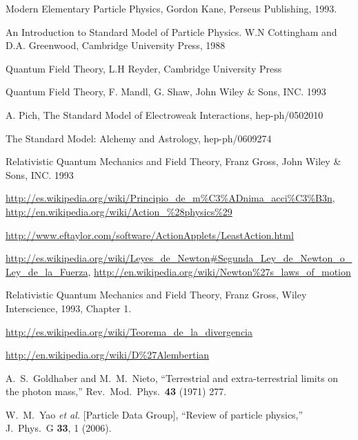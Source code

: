 
\begin{thebibliography}{999}
Modern Elementary Particle Physics, Gordon Kane, Perseus Publishing, 1993.

An Introduction to Standard Model of Particle Physics. W.N Cottingham and D.A. Greenwood, Cambridge University Press, 1988

Quantum Field Theory, L.H Reyder, Cambridge University Press

Quantum Field Theory, F. Mandl, G. Shaw, John Wiley \& Sons, INC. 1993

A. Pich, The Standard Model of Electroweak Interactions, hep-ph/0502010

The Standard Model: Alchemy and Astrology, hep-ph/0609274

Relativistic Quantum Mechanics and Field Theory, Franz Gross, John Wiley \& Sons, INC. 1993

\url{http://es.wikipedia.org/wiki/Principio_de_m\%C3\%ADnima_acci\%C3\%B3n}, 
\url{http://en.wikipedia.org/wiki/Action_\%28physics\%29}


\url{http://www.eftaylor.com/software/ActionApplets/LeastAction.html}

\url{http://es.wikipedia.org/wiki/Leyes_de_Newton#Segunda_Ley_de_Newton_o_Ley_de_la_Fuerza}, 
\href{http://en.wikipedia.org/wiki/Newton\%27s_laws_of_motion#Newton.27s_second_law:_law_of_acceleration}{http://en.wikipedia.org/wiki/Newton\%27s\_laws\_of\_motion}

Relativistic Quantum Mechanics and Field Theory, Franz Gross, Wiley Interscience, 1993, Chapter 1.

\url{http://es.wikipedia.org/wiki/Teorema_de_la_divergencia}

\url{http://en.wikipedia.org/wiki/D%27Alembertian}

  A.~S.~Goldhaber and M.~M.~Nieto,
  ``Terrestrial and extra-terrestrial limits on the photon mass,''
  Rev.\ Mod.\ Phys.\  {\bf 43} (1971) 277.

  W.~M.~Yao {\it et al.}  [Particle Data Group],
  ``Review of particle physics,''
  J.\ Phys.\ G {\bf 33}, 1 (2006).


\end{thebibliography}
